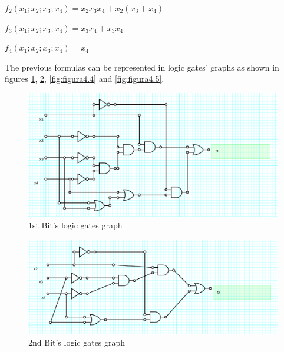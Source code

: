 \begin{center}
$f_{2}(x_{1};x_{2};x_{3};x_{4})=x_{2}\bar{x_{3}}\bar{x_{4}}+\bar{x_{2}}(x_{3}+x_{4})$
\par\end{center}

\begin{center}
$f_{3}(x_{1};x_{2};x_{3};x_{4})=x_{3}\bar{x_{4}}+\bar{x_{3}}x_{4}$
\par\end{center}

\begin{center}
$f_{4}(x_{1};x_{2};x_{3};x_{4})=x_{4}$
\par\end{center}

The previous formulas can be represented in logic gates' graphs as shown in figures \ref{fig:figura4.2},
\ref{fig:figura4.3}, \ref{fig:figura4.4} and \ref{fig:figura4.5}.

\begin{figure}[h!] %
\begin{centering}
\includegraphics[scale=0.25]{E4TP1/images/1}
\par\end{centering}
\caption{\color{cyan}1st Bit's logic gates graph}
\label{fig:figura4.2}
\end{figure}

\begin{figure}[h!]%
\begin{centering}
\includegraphics[scale=0.25]{E4TP1/images/2}
\par\end{centering}
\caption{\color{cyan}2nd Bit's logic gates graph}
\label{fig:figura4.3}
\end{figure}

